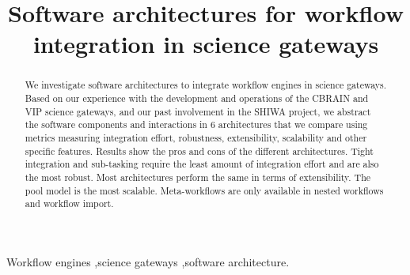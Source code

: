 \documentclass[preprint,3p,twocolumn]{elsarticle}
\begin{document}
\begin{frontmatter}



\title{Software architectures for workflow integration in science gateways}


\author{}

\address{}

\begin{abstract}
  We investigate software architectures to integrate workflow engines
  in science gateways. Based on our experience with the development
  and operations of the CBRAIN and VIP science gateways, and our past
  involvement in the SHIWA project, we abstract the software
  components and interactions in 6 architectures that we compare using
  metrics measuring integration effort, robustness, extensibility,
  scalability and other specific features. Results show the pros and
  cons of the different architectures. Tight integration and
  sub-tasking require the least amount of integration effort and are
  also the most robust. Most architectures perform the same in terms
  of extensibility. The pool model is the most
  scalable. Meta-workflows are only available in nested workflows and
  workflow import.
\end{abstract}

\begin{keyword}
Workflow engines \sep science gateways \sep software architecture.
\end{keyword}

\end{frontmatter}
\end{document}
